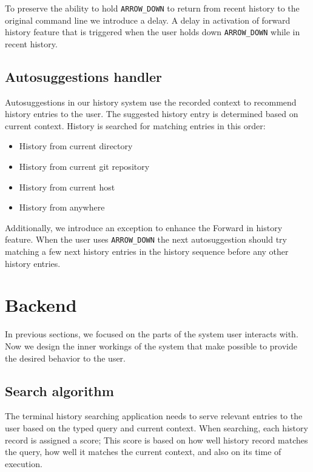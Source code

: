 To preserve the ability to hold \verb|ARROW_DOWN| to return from recent history to the original command line we introduce a delay. A delay in activation of forward history feature that is triggered when the user holds down \verb|ARROW_DOWN| while in recent history.

\subsection{Autosuggestions handler}

Autosuggestions in our history system use the recorded context to recommend history entries to the user. The suggested history entry is determined based on current context. History is searched for matching entries in this order:

\begin{itemize}
    \item History from current directory
    \item History from current git repository
    \item History from current host
    \item History from anywhere
\end{itemize}

Additionally, we introduce an exception to enhance the Forward in history feature. 
When the user uses \verb|ARROW_DOWN| the next autosuggestion should try matching a few next history entries in the history sequence before any  other history entries. 

\section{Backend}

In previous sections, we focused on the parts of the system user interacts with.
Now we design the inner workings of the system that make possible to provide the desired behavior to the user.

\subsection{Search algorithm}

The terminal history searching application needs to serve relevant entries to the user based on the typed query and current context. When searching, each history record is assigned a score; This score is based on how well history record matches the query, how well it matches the current context, and also on its time of execution. 

